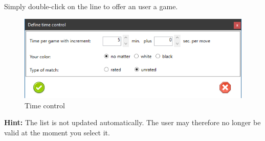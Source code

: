 \documentclass[11pt,a4paper]{article}
\begin{document}
Simply double-click on the line to offer an user a game.\\
\begin{figure}[H]
	\centering
	\includegraphics[scale=1.0]{fics4.png}
	\caption{Time control}
	\label{fig:ficsTimecontrol2}
\end{figure}
\textbf{Hint:} The list is not updated automatically. The user may therefore no longer be valid at the moment you select it.
\end{document}
